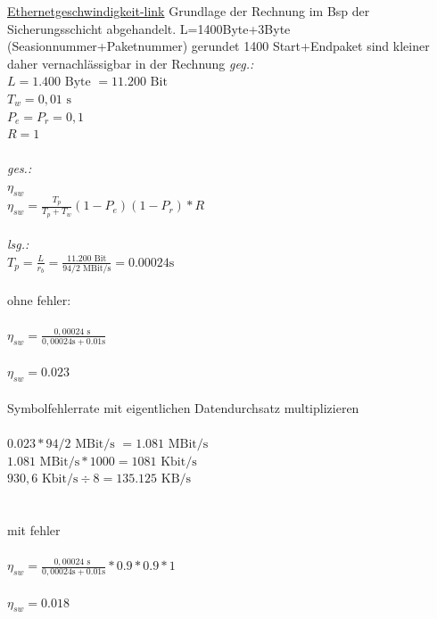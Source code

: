 \documentclass {article}[a4paper,12pt]
\begin{document}
\href{https://de.wikipedia.org/wiki/Datendurchsatz}{Ethernetgeschwindigkeit-link}
\newline
Grundlage der Rechnung im Bsp der Sicherungsschicht abgehandelt.
\newline
\newline
L=1400Byte+3Byte (Seasionnummer+Paketnummer) gerundet 1400
Start+Endpaket sind kleiner daher vernachlässigbar in der Rechnung
\newline
\newline
\textit{geg.:} 
\\
$ L = 1.400 \text{ Byte } = 11.200 \text{ Bit } $ \\
$ T_w = 0,01 \text{ s } $ \\
$ P_e = P_r = 0,1 $  \\
$ R = 1 $ \\ 
\\
\textit{ges.:}
\\
$ \eta_{sw} $ \\ 
$ \eta_{sw} = \frac{T_p}{T_{p} + T_{w}}(1-P_{e})(1-P_{r})*R $  \\
\\
\textit{lsg.:} 
\\
$ T_p = \frac{L}{r_b} = \frac{11.200 \text{ Bit}}{ 94/2\text{ MBit/s}} = 0.00024 \text{s} $ \\
\\ohne fehler: \\
\\
$ \eta_{sw}  = \frac{0,00024\text{ s }}{{0,00024}\text{s}+0.01\text{s}}$ \\
\\
$ \eta_{sw}  = 0.023$ \\
\\ Symbolfehlerrate mit eigentlichen Datendurchsatz multiplizieren\\
\\
$ 0.023 * 94/2\text{ MBit/s } = 1.081 \text{ MBit/s} $ \\ 
$ 1.081 \text{ MBit/s} * 1000 = 1081 \text{ Kbit/s} $ \\ 
$ 930,6 \text{ Kbit/s} \div 8 = 135.125 \text{ KB/s} $ \\ 
\\
\\mit fehler \\
\\
$ \eta_{sw}  = \frac{0,00024\text{ s }}{{0,00024}\text{s}+0.01\text{s}}*0.9*0.9*1$ \\
\\
$ \eta_{sw}  = 0.018 $ \\
\end{document}

